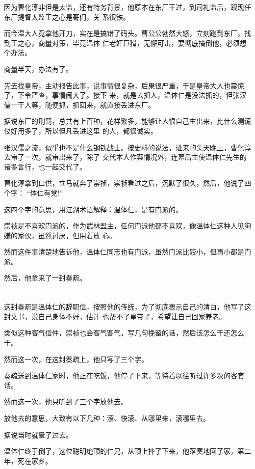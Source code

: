 \documentclass[11pt,a4paper,onecolumn]{article}
\begin{document}
因为曹化淳非但是太监，还有特务背景，他原本在东厂干过，到司礼监后，跟现任东厂提督太监王之心是哥们，关
系很铁。

而今温大人竟拿他开刀，实在是搞错了码头。曹公公勃然大怒，立刻跑到东厂，找到王之心，商量对策，毕竟温体
仁老奸巨猾，无懈可击，要彻底搞倒他，必须想个办法。

商量半天，办法有了。

先去找皇帝，主动报告此事，说事情很复杂，后果很严重，于是皇帝大人也震惊了，下令严查，事情闹大了。接下
来，就是去抓人，温体仁是没法抓的，但张汉儒一干人等，随便抓，抓回来，就直接丢进东厂。

据说东厂的刑罚，总共有上百种，花样繁多，能够让人恨自己生出来，比什么测谎仪好用多了，所以但凡丢进这里
的人，都很诚实。

张汉儒之流，似乎也不是什么钢铁战士。按史料的说法，进来的头天晚上，曹化淳去审了一次，就审出来了，除了
交代本人作案情况外，连幕后主使温体仁先生的诸多言行，也一起交代了。

曹化淳拿到口供，立马就奔了崇祯，崇祯看过之后，沉默了很久，然后，他说了四个字： ``体仁有党!''

这四个字的意思，用江湖术语解释：温体仁，是有门派的。

崇祯是不喜欢门派的，作为武林盟主，任何门派他都不喜欢，像温体仁这种人见狗嫌的家伙，虽然讨厌，但用着放
心。

然而这件事清楚地告诉他，温体仁同志也有门派，虽然门派比较小，但再小都是门派。

然后，他拿来了一封奏疏。

\section[\thesection]{}

这封奏疏是温体仁的辞职信，按照他的传统，为了彻底表示自己的清白，他写了这封文书，说自己身体不好，估计
也帮不了皇帝了，希望让自己回家养老。

类似这种客气信件，崇祯也会客气客气，写几句挽留的话，然后该怎么干还怎么干。

然而这一次，在这封奏疏上，他只写了三个字。

奏疏送到温体仁家时，他正在吃饭，他停了下来，等待着以往听过许多次的客套话。

然而这一次，他只听到了三个字\myrule 放他去。

放他去的意思，大致有以下几种：滚、快滚、从哪里来，滚哪里去。

据说当时就晕了过去。

温体仁终于倒了，这位聪明绝顶的仁兄，从顶上摔了下来，他落寞地回了家，第二年，死在家乡。
\end{document}
